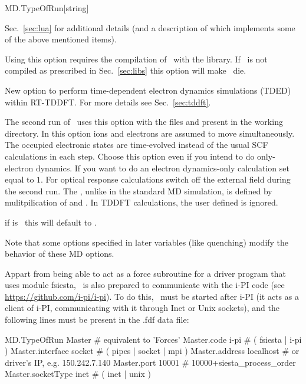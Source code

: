 \begin{fdfentry}{MD.TypeOfRun}[string]
\begin{fdfoptions}
\begin{itemize}
    \end{itemize}
    Sec.~\ref{sec:lua} for additional details (and a description of
     which implements some of the above mentioned items).

    Using this option requires the compilation of \siesta\ with the
     library.%
    If \siesta\ is not compiled as prescribed in Sec.~\ref{sec:libs}
    this option will make \siesta\ die.

    \option[TDED]%

    New option to perform time-dependent electron dynamics simulations
    (TDED) within RT-TDDFT. For more details see
    Sec.~\ref{sec:tddft}.

    The second run of \siesta\ uses this option with the files
     and  present in the working
    directory.  In this option ions and electrons are assumed to move
    simultaneously. The occupied electronic states are time-evolved
    instead of the usual SCF calculations in each step.  Choose this
    option even if you intend to do only-electron dynamics. If you
    want to do an electron dynamics-only calculation set
     equal to $1$. For optical response
    calculations switch off the external field during the second
    run. The , unlike in the standard MD
    simulation, is defined by mulitpilication of 
    and . In TDDFT calculations, the user defined
     is ignored.


  \end{fdfoptions}

  \note if  is \fdftrue\ this will default
  to .

  Note that some options specified in later variables (like quenching)
  modify the behavior of these MD options.

  Appart from being able to act as a force subroutine for a driver
  program that uses module fsiesta, \siesta\ is also prepared to
  communicate with the i-PI code (see
  \url{https://github.com/i-pi/i-pi}).
  To do this, \siesta\ must be started after i-PI (it acts as a client
  of i-PI, communicating with it through Inet or Unix sockets), and
  the following lines must be present in the .fdf data file:
  \begin{fdfexample}
     MD.TypeOfRun      Master     # equivalent to 'Forces'
     Master.code       i-pi       # ( fsiesta | i-pi )
     Master.interface  socket     # ( pipes | socket | mpi )
     Master.address    localhost  # or driver's IP, e.g. 150.242.7.140
     Master.port       10001      # 10000+siesta_process_order
     Master.socketType inet       # ( inet | unix )
  \end{fdfexample}

\end{fdfentry}



